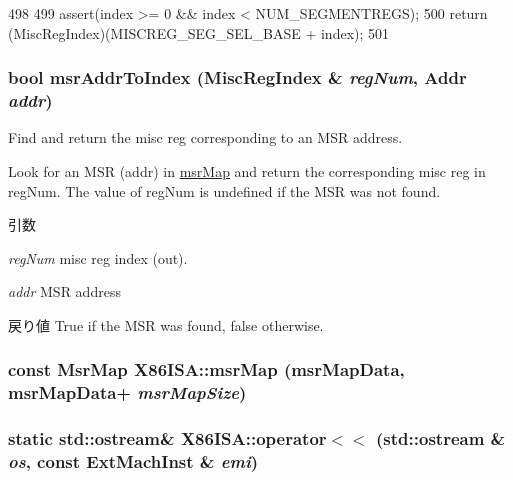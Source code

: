\begin{DoxyCode}
498     {
499         assert(index >= 0 && index < NUM_SEGMENTREGS);
500         return (MiscRegIndex)(MISCREG_SEG_SEL_BASE + index);
501     }
\end{DoxyCode}
\hypertarget{namespaceX86ISA_a700421607b87243921222a0b4183eef3}{
\subsubsection[{msrAddrToIndex}]{\setlength{\rightskip}{0pt plus 5cm}bool msrAddrToIndex (MiscRegIndex \& {\em regNum}, \/  {\bf Addr} {\em addr})}}
\label{namespaceX86ISA_a700421607b87243921222a0b4183eef3}
Find and return the misc reg corresponding to an MSR address.

Look for an MSR (addr) in \hyperlink{namespaceX86ISA_a668a095a9f8f9c629c5b12ff0bb8a721}{msrMap} and return the corresponding misc reg in regNum. The value of regNum is undefined if the MSR was not found.


\begin{DoxyParams}{引数}
\item[{\em regNum}]misc reg index (out). \item[{\em addr}]MSR address \end{DoxyParams}
\begin{DoxyReturn}{戻り値}
True if the MSR was found, false otherwise. 
\end{DoxyReturn}
\hypertarget{namespaceX86ISA_ad9614112983ab7c76827d78c01261157}{
\subsubsection[{msrMap}]{\setlength{\rightskip}{0pt plus 5cm}const {\bf MsrMap} {\bf X86ISA::msrMap} (msrMapData, \/  msrMapData+ {\em msrMapSize})}}
\label{namespaceX86ISA_ad9614112983ab7c76827d78c01261157}
\hypertarget{namespaceX86ISA_a1c0edac96eed6e133103cbbc46effa5a}{
\subsubsection[{operator$<$$<$}]{\setlength{\rightskip}{0pt plus 5cm}static std::ostream\& X86ISA::operator$<$$<$ (std::ostream \& {\em os}, \/  const ExtMachInst \& {\em emi})}}
\label{namespaceX86ISA_a1c0edac96eed6e133103cbbc46effa5a}



